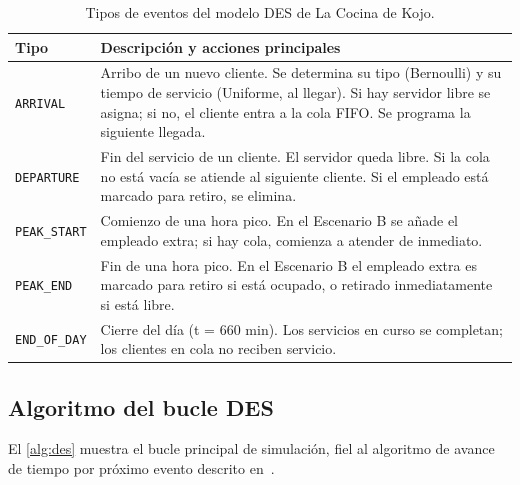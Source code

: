 \begin{table}[H]
  \centering
  \caption{Tipos de eventos del modelo DES de La Cocina de Kojo.}
  \label{tab:eventos}
  \begin{tabular}{lp{9cm}}
    \toprule
    \textbf{Tipo} & \textbf{Descripción y acciones principales} \\
    \midrule
    \texttt{ARRIVAL}        & Arribo de un nuevo cliente. Se determina su tipo
                              (Bernoulli) y su tiempo de servicio (Uniforme, al llegar).
                              Si hay servidor libre se asigna; si no, el cliente
                              entra a la cola FIFO.
                              Se programa la siguiente llegada. \\
    \addlinespace
    \texttt{DEPARTURE}        & Fin del servicio de un cliente. El servidor queda
                              libre. Si la cola no está vacía se atiende al
                              siguiente cliente. Si el empleado está marcado
                              para retiro, se elimina. \\
    \addlinespace
    \texttt{PEAK\_START}   & Comienzo de una hora pico. En el Escenario B se
                              añade el empleado extra; si hay cola, comienza a
                              atender de inmediato. \\
    \addlinespace
    \texttt{PEAK\_END}      & Fin de una hora pico. En el Escenario B el empleado
                              extra es marcado para retiro si está ocupado, o
                              retirado inmediatamente si está libre. \\
    \addlinespace
    \texttt{END\_OF\_DAY}& Cierre del día (t = 660 min). Los servicios en curso
                              se completan; los clientes en cola no reciben servicio. \\
    \bottomrule
  \end{tabular}
\end{table}

\subsection{Algoritmo del bucle DES}

El \cref{alg:des} muestra el bucle principal de simulación, fiel al
algoritmo de avance de tiempo por próximo evento descrito
en~\citet{banks2010discrete}.

